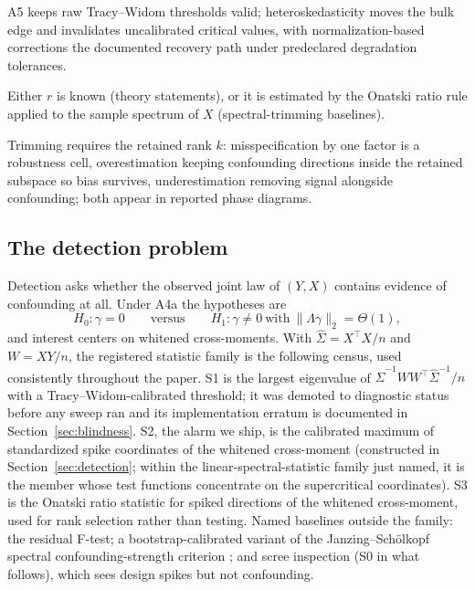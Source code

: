 A5 keeps raw Tracy--Widom thresholds valid; heteroskedasticity moves the bulk edge and invalidates uncalibrated critical values, with normalization-based corrections the documented recovery path under predeclared degradation tolerances.

\begin{assumption}
\label{assump:A6}
Either $r$ is known (theory statements), or it is estimated by the Onatski ratio rule applied to the sample spectrum of $X$ (spectral-trimming baselines).
\end{assumption}

Trimming requires the retained rank $k$: misspecification by one factor is a robustness cell, overestimation keeping confounding directions inside the retained subspace so bias survives, underestimation removing signal alongside confounding; both appear in reported phase diagrams.

\subsection{The detection problem}
\label{subsec:detection}

Detection asks whether the observed joint law of $(Y,X)$ contains evidence of confounding at all. Under A4a the hypotheses are
\[
H_0\colon \gamma = 0 \qquad\text{versus}\qquad H_1\colon \gamma \ne 0 \ \text{with}\ \|\Lambda\gamma\|_2 = \Theta(1),
\]
and interest centers on whitened cross-moments. With $\widehat\Sigma = X^\top X/n$ and $W = XY/n$, the registered statistic family is the following census, used consistently throughout the paper. S1 is the largest eigenvalue of $\widehat\Sigma^{-1} W W^\top \widehat\Sigma^{-1}/n$ with a Tracy--Widom-calibrated threshold; it was demoted to diagnostic status before any sweep ran and its implementation erratum is documented in Section~\ref{sec:blindness}. S2, the alarm we ship, is the calibrated maximum of standardized spike coordinates of the whitened cross-moment (constructed in Section~\ref{sec:detection}; within the linear-spectral-statistic family just named, it is the member whose test functions concentrate on the supercritical coordinates). S3 is the Onatski ratio statistic for spiked directions of the whitened cross-moment, used for rank selection rather than testing. Named baselines outside the family: the residual F-test; a bootstrap-calibrated variant of the Janzing--Sch\"olkopf spectral confounding-strength criterion \citep{janzing2018detecting,rendsburg2024consistent}; and scree inspection (S0 in what follows), which sees design spikes but not confounding.

